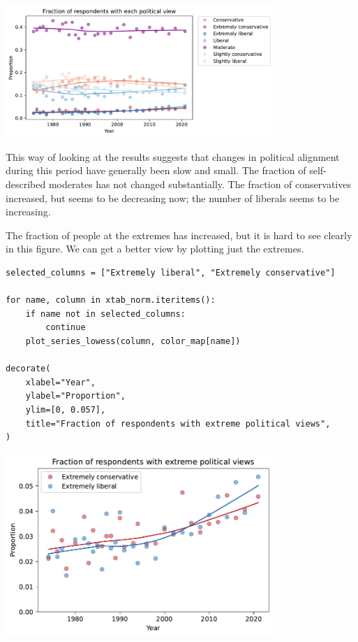 \begin{center}
\includegraphics[width=4in]{chapters/02_polviews_files/02_polviews_88_0.pdf}
\end{center}

This way of looking at the results suggests that changes in political
alignment during this period have generally been slow and small. The
fraction of self-described moderates has not changed substantially. The
fraction of conservatives increased, but seems to be decreasing now; the
number of liberals seems to be increasing.

The fraction of people at the extremes has increased, but it is hard to
see clearly in this figure. We can get a better view by plotting just
the extremes.

\begin{lstlisting}[]
selected_columns = ["Extremely liberal", "Extremely conservative"]

for name, column in xtab_norm.iteritems():
    if name not in selected_columns:
        continue
    plot_series_lowess(column, color_map[name])

decorate(
    xlabel="Year",
    ylabel="Proportion",
    ylim=[0, 0.057],
    title="Fraction of respondents with extreme political views",
)
\end{lstlisting}

\begin{center}
\includegraphics[width=4in]{chapters/02_polviews_files/02_polviews_90_0.pdf}
\end{center}

